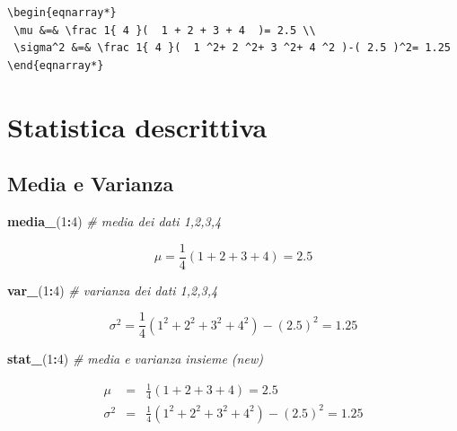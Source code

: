 \documentclass[
  11pt,
]{book}
\newenvironment{Shaded}{\begin{snugshade}}{\end{snugshade}}
\newcommand{\CommentTok}[1]{\textcolor[rgb]{0.56,0.35,0.01}{\textit{#1}}}
\newcommand{\DecValTok}[1]{\textcolor[rgb]{0.00,0.00,0.81}{#1}}
\newcommand{\FunctionTok}[1]{\textcolor[rgb]{0.13,0.29,0.53}{\textbf{#1}}}
\newcommand{\NormalTok}[1]{#1}
\newcommand{\SpecialCharTok}[1]{\textcolor[rgb]{0.81,0.36,0.00}{\textbf{#1}}}
\theoremstyle{mytheoremstyle}
\theoremstyle{mydefstyle}
\begin{document}
\begin{verbatim}
\begin{eqnarray*}
 \mu &=& \frac 1{ 4 }(  1 + 2 + 3 + 4  )= 2.5 \\ 
 \sigma^2 &=& \frac 1{ 4 }(  1 ^2+ 2 ^2+ 3 ^2+ 4 ^2 )-( 2.5 )^2= 1.25 
\end{eqnarray*}
\end{verbatim}

\section{Statistica descrittiva}\label{statistica-descrittiva}

\subsection{Media e Varianza}\label{media-e-varianza}

\begin{Shaded}
\begin{Highlighting}[]
\FunctionTok{media\_}\NormalTok{(}\DecValTok{1}\SpecialCharTok{:}\DecValTok{4}\NormalTok{)                     }\CommentTok{\# media dei dati 1,2,3,4}
\end{Highlighting}
\end{Shaded}

\[ \mu =\frac 1{ 4 }( 1+2+3+4 )= 2.5 \]

\begin{Shaded}
\begin{Highlighting}[]
\FunctionTok{var\_}\NormalTok{(}\DecValTok{1}\SpecialCharTok{:}\DecValTok{4}\NormalTok{)                       }\CommentTok{\# varianza dei dati 1,2,3,4}
\end{Highlighting}
\end{Shaded}

\[ \sigma^2 =\frac 1{ 4 }( 1^2+2^2+3^2+4^2 )-( 2.5 )^2= 1.25 \]

\begin{Shaded}
\begin{Highlighting}[]
\FunctionTok{stat\_}\NormalTok{(}\DecValTok{1}\SpecialCharTok{:}\DecValTok{4}\NormalTok{)                      }\CommentTok{\# media e varianza insieme (new)}
\end{Highlighting}
\end{Shaded}

\begin{eqnarray*}
 \mu &=& \frac 1{ 4 }(  1 + 2 + 3 + 4  )= 2.5 \\ 
 \sigma^2 &=& \frac 1{ 4 }(  1 ^2+ 2 ^2+ 3 ^2+ 4 ^2 )-( 2.5 )^2= 1.25 
\end{eqnarray*}
\end{document}
